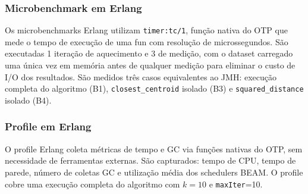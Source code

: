 \subsubsection{Microbenchmark em Erlang}

Os microbenchmarks Erlang utilizam \texttt{timer:tc/1}, função nativa do OTP que
mede o tempo de execução de uma fun com resolução de microssegundos. São executadas
1 iteração de aquecimento e 3 de medição, com o dataset carregado uma única vez em
memória antes de qualquer medição para eliminar o custo de I/O dos resultados.
São medidos três casos equivalentes ao JMH: execução completa do algoritmo (B1),
\texttt{closest\_centroid} isolado (B3) e \texttt{squared\_distance} isolado (B4).

\subsubsection{Profile em Erlang}

O profile Erlang coleta métricas de tempo e GC via funções nativas do OTP, sem
necessidade de ferramentas externas. São capturados: tempo de CPU, tempo de parede,
número de coletas GC e utilização média dos schedulers BEAM. O profile cobre uma
execução completa do algoritmo com $k=10$ e \texttt{maxIter}=10.